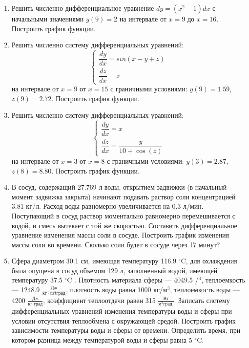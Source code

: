 \begin{enumerate}
\item Решить численно дифференциальное уравнение $dy=(x^2-1)dx                          $ с начальными значениями $y(     9)=     2$ на интервале от $x=     9$ до $x=    16$. Построить график функции.\item Решить численно систему дифференциальных уравнений:
 \begin{equation*}
\left\{
\begin{gathered}
\dfrac{dy}{dx}=sin(x-y+z)            \\
\dfrac{dz}{dx}=z                     
\end{gathered}
\right.
\end{equation*}
на интервале от $x= 9$ от $x=15$ с граничными условиями: $y( 9)=1.59$, $z( 9)=2.72$. Построить график функции. 
\item Решить численно систему дифференциальных уравнений:
 \begin{equation*}
\left\{
\begin{gathered}
\dfrac{dy}{dx}=x\\
\dfrac{dz}{dx}=\dfrac{y}{10+\cos(z)}
\end{gathered}
\right.
\end{equation*}
на интервале от $x= 3$ от $x= 8$ с граничными условиями: $y( 3)=2.87$, $z( 8)=8.80$.  Построить график функции. 
\item  В сосуд, содержащий 27.769 л воды, открытием задвижки (в начальный момент задвижка закрыта) начинают подавать раствор соли концентрацией 3.81 кг/л. Расход воды равномерно увеличивается на 0.3 л/мин. Поступающий в сосуд раствор моментально равномерно перемешивается с водой, и смесь вытекает с той же скоростью. Составить дифференциальное уравнение изменения массы соли в сосуде. Построить график изменения массы соли во времени. Сколько соли будет в сосуде через  17 минут?

\item  Сфера диаметром 30.1 см, имеющая температуру 116.9 $^\circ\mathrm{C}$, для охлаждения была опущена в сосуд объемом  129 л, заполненный водой, имеющей температуру 37.5 $^\circ\mathrm{C}$ . Плотность материала сферы --- 4049.5 /$^\mathrm{3}$, теплоемкость --- 1248.9 $\frac{\text{Дж}}{\text{кг}\cdot 	ext{град}}$, плотность воды равна 1000 $\text{кг}/\text{м}^\mathrm{3}$, теплоемкость воды --- 4200 $\frac{\text{Дж}}{\text{кг}\cdot \text{град}}$, коэффициент теплоотдачи равен   315 $\frac{\text{Вт}}{\text{м}^2 \text{град.}}$. Записать систему дифференциальных уравнений изменения температуры воды и сферы при условии отсутствия теплообмена с окружающей средой. Построить график зависимости температуры воды и сферы от времени. Определить время, при котором разница между температурой воды и сферы равна 5 $^\circ\mathrm{C}$. 

\end{enumerate}
\newpage
